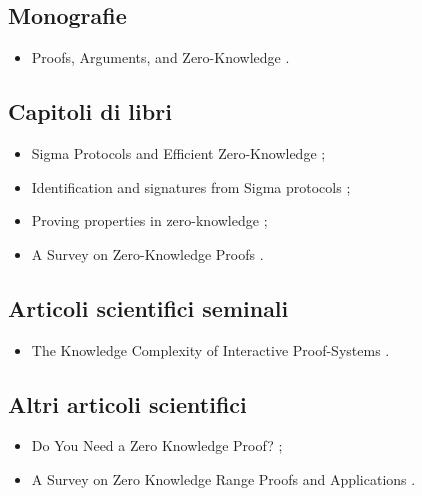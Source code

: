 \subsection*{Monografie}
\begin{itemize}

\item Proofs, Arguments, and Zero-Knowledge \cite{thaler2022pokbook}.

\end{itemize}

\subsection*{Capitoli di libri}
\begin{itemize}

\item Sigma Protocols and Efficient Zero-Knowledge \cite{hazay2010sigmazero};

\item Identification and signatures from Sigma protocols \cite{boneh2023sigma};

\item Proving properties in zero-knowledge \cite{boneh2023zero};

\item A Survey on Zero-Knowledge Proofs \cite{li2014zero}.

\end{itemize}

\subsection*{Articoli scientifici seminali}
\begin{itemize}

\item The Knowledge Complexity of Interactive Proof-Systems \cite{goldwasser1985pok}.

\end{itemize}

\subsection*{Altri articoli scientifici}
\begin{itemize}

\item Do You Need a Zero Knowledge Proof? \cite{ernstberger2024zeroneed};

\item A Survey on Zero Knowledge Range Proofs and Applications \cite{morais2019zero}.

\end{itemize}

